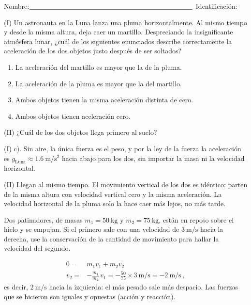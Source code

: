 \documentclass[12pt, a4paper]{article}
\begin{document}
\vspace*{-2cm}
Nombre:$\underline{\hspace{8.5cm}}$ Identificación: \hrulefill

\quad

\begin{exercise}[ID=luna, tags={parcial2}, points=16]
(I) Un astronauta en la Luna lanza una pluma horizontalmente. Al mismo tiempo y desde la misma altura, deja caer un martillo. Despreciando la insignificante atmósfera lunar, ¿cuál de los siguientes enunciados describe correctamente la aceleración de los dos objetos justo después de ser soltados?
\begin{enumerate}
    \item La aceleración del martillo es mayor que la de la pluma.
 \item La aceleración de la pluma es mayor que la del martillo.
\item Ambos objetos tienen la misma aceleración distinta de cero.
\item Ambos objetos tienen aceleración cero.
\end{enumerate}

(II) ¿Cuál de los dos objetos llega primero al suelo?

\vspace{4cm}
\end{exercise}
\begin{solution}
(I) c). Sin aire, la única fuerza es el peso, y por la ley de la fuerza la aceleración es $g_{\text{Luna}}\approx\qty{1.6}{\m/\s^2}$ hacia abajo para los dos, sin importar la masa ni la velocidad horizontal.

(II) Llegan al mismo tiempo. El movimiento vertical de los dos es idéntico: parten de la misma altura con velocidad vertical cero y la misma aceleración. La velocidad horizontal de la pluma solo la hace caer más lejos, no más tarde.
\end{solution}

\begin{exercise}[ID=patinadores, tags={parcial2}, points=16]
Dos patinadores, de masas $m_1=\qty{50}{\kilo\g}$ y $m_2=\qty{75}{\kilo\g}$, están en reposo sobre el hielo y se empujan. Si el primero sale con una velocidad de $\qty{3}{\m/\s}$ hacia la derecha, use la conservación de la cantidad de movimiento para hallar la velocidad del segundo.
\end{exercise}
\begin{solution}
\begin{align}
    0 =& m_1 v_1 + m_2 v_2\nonumber\\
    v_2 =& -\frac{m_1}{m_2}\,v_1 = -\frac{50}{75}\times\qty{3}{\m/\s} = \qty{-2}{\m/\s}\,,
\end{align}
es decir, $\qty{2}{\m/\s}$ hacia la izquierda: el más pesado sale más despacio. Las fuerzas que se hicieron son iguales y opuestas (acción y reacción).
\end{solution}
\end{document}
